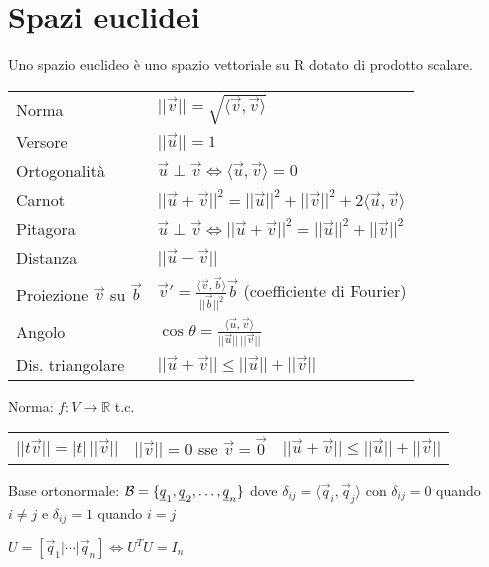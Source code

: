 \section{Spazi euclidei}

Uno spazio euclideo è uno spazio vettoriale su R dotato di prodotto scalare.

\begin{tabular}{ll}
	Norma & $||\vec{v}|| = \sqrt{\langle\vec{v},\vec{v}\rangle}$ \\
	Versore & $||\vec{u}|| = 1$ \\
	Ortogonalità & $\vec{u} \perp \vec{v} \iff \langle\vec{u},\vec{v}\rangle = 0$ \\
	Carnot & $||\vec{u}+\vec{v}||^2 = ||\vec{u}||^2+||\vec{v}||^2+2\langle\vec{u},\vec{v}\rangle$ \\
	Pitagora & $\vec{u} \perp \vec{v} \iff ||\vec{u}+\vec{v}||^2 = ||\vec{u}||^2+||\vec{v}||^2$ \\
	Distanza & $||\vec{u}-\vec{v}||$ \\
	Proiezione $\vec{v}$ su $\vec{b}$ & $\vec{v}' = \frac{\langle\vec{v},\vec{b}\rangle}{||\vec{b}||^2}\vec{b}$ (coefficiente di Fourier) \\
	Angolo & $\cos \theta = \frac{\langle\vec{u},\vec{v}\rangle}{||\vec{u}||\,||\vec{v}||}$ \\
	Dis. triangolare & $||\vec{u}+\vec{v}|| \le ||\vec{u}||+||\vec{v}||$ \\
\end{tabular}

Norma: $f: V \rightarrow \mathbb{R}$ t.c.
\begin{tabular}{lll}
	$||t\vec{v}|| = |t|\,||\vec{v}||$ &
	$||\vec{v}|| = 0$ sse $\vec{v} = \vec{0}$ &
	$||\vec{u}+\vec{v}|| \le ||\vec{u}||+||\vec{v}||$
\end{tabular}

Base ortonormale: $\mathcal{B} = \{\underline{q}_1, \underline{q}_2, \dots, \underline{q}_n\}$ dove $\delta_{ij} = \langle\vec{q}_i,\vec{q}_j\rangle$ con $\delta_{ij} = 0$ quando $i \ne j$ e $\delta_{ij} = 1$ quando $i = j$

$U = [\vec{q}_1 | \cdots | \vec{q}_n] \iff U^TU=I_n$
